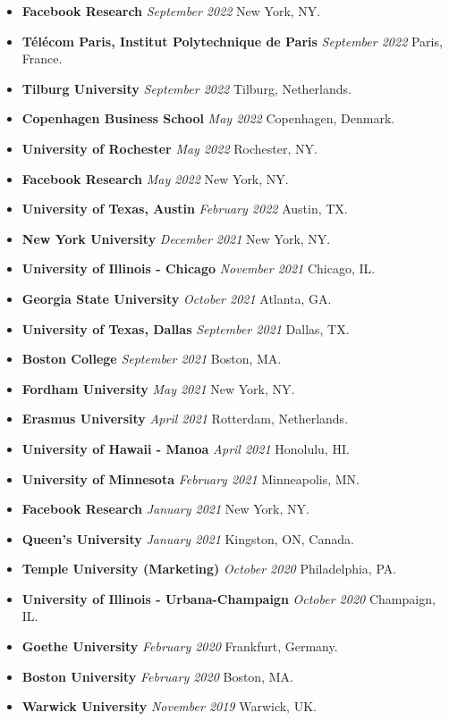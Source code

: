 \documentclass[10.5pt,letterpaper,sans]{moderncv}        %
\begin{document}
\begin{itemize}
\item \textbf{Facebook Research} \textit{September 2022} New York, NY.
\item \textbf{T\'el\'ecom Paris, Institut Polytechnique de Paris} \textit{September 2022} Paris, France.
\item \textbf{Tilburg University} \textit{September 2022} Tilburg, Netherlands.
\item \textbf{Copenhagen Business School} \textit{May 2022} Copenhagen, Denmark.
\item \textbf{University of Rochester} \textit{May 2022} Rochester, NY.
\item \textbf{Facebook Research} \textit{May 2022} New York, NY.
\item \textbf{University of Texas, Austin} \textit{February 2022} Austin, TX.
\item \textbf{New York University} \textit{December 2021} New York, NY.
\item \textbf{University of Illinois - Chicago} \textit{November 2021} Chicago, IL.
\item \textbf{Georgia State University} \textit{October 2021} Atlanta, GA.
\item \textbf{University of Texas, Dallas} \textit{September 2021} Dallas, TX.
\item \textbf{Boston College} \textit{September 2021} Boston, MA.
\item \textbf{Fordham University} \textit{May 2021} New York, NY.
\item \textbf{Erasmus University} \textit{April 2021} Rotterdam, Netherlands.
\item \textbf{University of Hawaii - Manoa} \textit{April 2021} Honolulu, HI.
\item \textbf{University of Minnesota} \textit{February 2021} Minneapolis, MN.
\item \textbf{Facebook Research} \textit{January 2021} New York, NY.
\item \textbf{Queen's University} \textit{January 2021} Kingston, ON, Canada.
\item \textbf{Temple University (Marketing)} \textit{October 2020} Philadelphia, PA.
\item \textbf{University of Illinois - Urbana-Champaign} \textit{October 2020} Champaign, IL.
\item \textbf{Goethe University} \textit{February 2020} Frankfurt, Germany.
\item \textbf{Boston University} \textit{February 2020} Boston, MA.
\item \textbf{Warwick University} \textit{November 2019} Warwick, UK.

\end{itemize}
\end{document}
